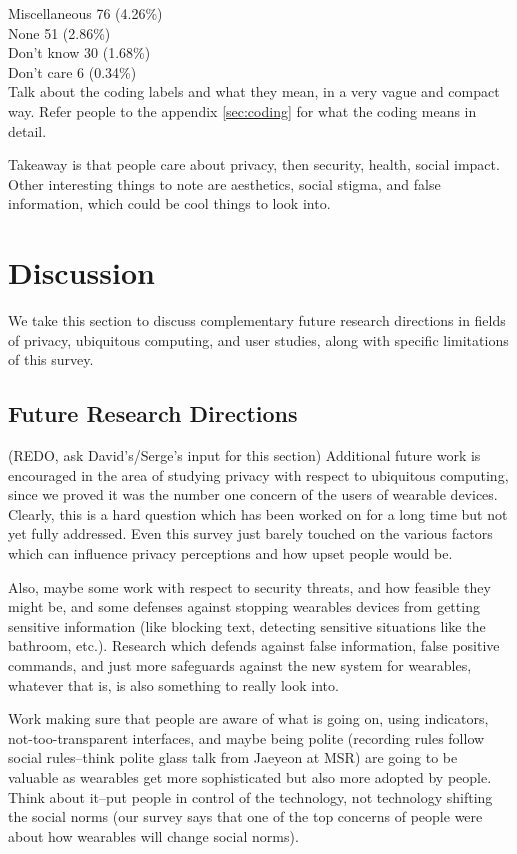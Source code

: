 \documentclass{acm_proc_article-sp}
\begin{document}
Miscellaneous 		76 (4.26\%)\\
None				51 (2.86\%)\\
Don't know			 30 (1.68\%)\\
Don't care 			6 (0.34\%)\\

Talk about the coding labels and what they mean, in a very vague and compact way. Refer people to the appendix \ref{sec:coding} for what the coding means in detail. 

Takeaway is that people care about privacy, then security, health, social impact. Other interesting things to note are aesthetics, social stigma, and false information, which could be cool things to look into. 


\section{Discussion}
We take this section to discuss complementary future research directions in fields of privacy, ubiquitous computing, and user studies, along with specific limitations of this survey. 

\subsection{Future Research Directions}
(REDO, ask David's/Serge's input for this section) Additional future work is encouraged in the area of studying privacy with respect to ubiquitous computing, since we proved it was the number one concern of the users of wearable devices. Clearly, this is a hard question which has been worked on for a long time but not yet fully addressed. Even this survey just barely touched on the various factors which can influence privacy perceptions and how upset people would be. 

 Also, maybe some work with respect to security threats, and how feasible they might be, and some defenses against stopping wearables devices from getting sensitive information (like blocking text, detecting sensitive situations like the bathroom, etc.). Research which defends against false information, false positive commands, and just more safeguards against the new system for wearables, whatever that is, is also something to really look into. 
 
 Work making sure that people are aware of what is going on, using indicators, not-too-transparent interfaces, and maybe being polite (recording rules follow social rules--think polite glass talk from Jaeyeon at MSR) are going to be valuable as wearables get more sophisticated but also more adopted by people. Think about it--put people in control of the technology, not technology shifting the social norms (our survey says that one of the top concerns of people were about how wearables will change social norms). 
\end{document}
